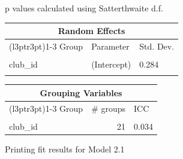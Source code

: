 \documentclass[
  12pt]{article}
\begin{document}
\begin{table}[!h]
\begin{threeparttable}
\begin{tablenotes}
\item  p values calculated using Satterthwaite d.f. 
\end{tablenotes}
\end{threeparttable}
\end{table} \begin{table}[!h]
\centering
\begin{tabular}{lll}
\toprule
\multicolumn{3}{c}{Random Effects} \\
\cmidrule(l{3pt}r{3pt}){1-3}
Group & Parameter & Std. Dev.\\
\midrule
\cellcolor{gray!10}{player\_id} & \cellcolor{gray!10}{(Intercept)} & \cellcolor{gray!10}{1.321}\\
club\_id & (Intercept) & 0.284\\
\cellcolor{gray!10}{Residual} & \cellcolor{gray!10}{} & \cellcolor{gray!10}{0.718}\\
\bottomrule
\end{tabular}
\end{table} \begin{table}[!h]
\centering
\begin{tabular}{lrl}
\toprule
\multicolumn{3}{c}{Grouping Variables} \\
\cmidrule(l{3pt}r{3pt}){1-3}
Group & \# groups & ICC\\
\midrule
\cellcolor{gray!10}{player\_id} & \cellcolor{gray!10}{2159} & \cellcolor{gray!10}{0.746}\\
club\_id & 21 & 0.034\\
\bottomrule
\end{tabular}
\end{table}

\newpage

Printing fit results for Model 2.1
\end{document}
